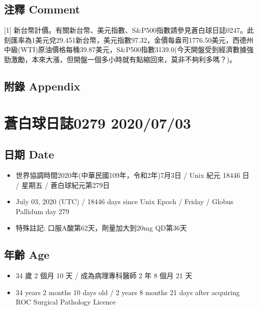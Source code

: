 \documentclass[
]{article}
\providecommand{\tightlist}{%
  \setlength{\itemsep}{0pt}\setlength{\parskip}{0pt}}
\begin{document}
\hypertarget{ux6ce8ux91cb-comment-1}{%
\subsection{注釋 Comment}\label{ux6ce8ux91cb-comment-1}}

{[}1{]}
新台幣計價。有關新台幣、美元指數、S\&P500指數請參見蒼白球日誌0247。此刻匯率為1美元兌29.451新台幣，美元指數97.32，金價每盎司1776.50美元，西德州中級(WTI)原油價格每桶39.87美元，S\&P500指數3139.0(今天開盤受到經濟數據強勁激勵，本來大漲，但開盤一個多小時就有點縮回來，莫非不夠利多嗎？)。

\hypertarget{ux9644ux9304-appendix-1}{%
\subsection{附錄 Appendix}\label{ux9644ux9304-appendix-1}}

\hypertarget{ux84bcux767dux7403ux65e5ux8a8c0279-20200703}{%
\section{蒼白球日誌0279
2020/07/03}\label{ux84bcux767dux7403ux65e5ux8a8c0279-20200703}}

\hypertarget{ux65e5ux671f-date-2}{%
\subsection{日期 Date}\label{ux65e5ux671f-date-2}}

\begin{itemize}
\tightlist
\item
  世界協調時間2020年(中華民國109年，令和2年)7月3日 / Unix 紀元 18446 日
  / 星期五 / 蒼白球紀元第279日
\item
  July 03, 2020 (UTC) / 18446 days since Unix Epoch / Friday / Globus
  Pallidum day 279
\item
  特殊註記: 口服A酸第62天，劑量加大到20mg QD第36天
\end{itemize}

\hypertarget{ux5e74ux9f61-age-2}{%
\subsection{年齡 Age}\label{ux5e74ux9f61-age-2}}

\begin{itemize}
\tightlist
\item
  34 歲 2 個月 10 天 / 成為病理專科醫師 2 年 8 個月 21 天
\item
  34 years 2 months 10 days old / 2 years 8 months 21 days after
  acquiring ROC Surgical Pathology Licence
\end{itemize}
\end{document}
